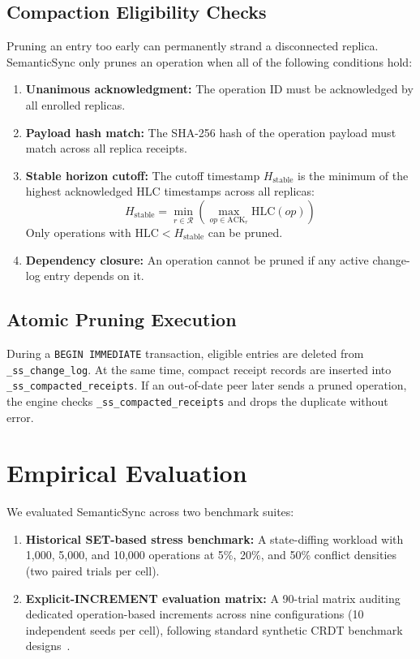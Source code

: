\documentclass[conference]{IEEEtran}
\begin{document}
\subsection{Compaction Eligibility Checks}
Pruning an entry too early can permanently strand a disconnected replica. SemanticSync only prunes an operation when all of the following conditions hold:
\begin{enumerate}
    \item \textbf{Unanimous acknowledgment:} The operation ID must be acknowledged by all enrolled replicas.
    \item \textbf{Payload hash match:} The SHA-256 hash of the operation payload must match across all replica receipts.
    \item \textbf{Stable horizon cutoff:} The cutoff timestamp $H_{\text{stable}}$ is the minimum of the highest acknowledged HLC timestamps across all replicas:
    \begin{equation}
    H_{\text{stable}} = \min_{r \in \mathcal{R}} \left( \max_{op \in \text{ACK}_r} \text{HLC}(op) \right)
    \end{equation}
    Only operations with $\text{HLC} < H_{\text{stable}}$ can be pruned.
    \item \textbf{Dependency closure:} An operation cannot be pruned if any active change-log entry depends on it.
\end{enumerate}

\subsection{Atomic Pruning Execution}
During a \texttt{BEGIN IMMEDIATE} transaction, eligible entries are deleted from \texttt{\_ss\_change\_log}. At the same time, compact receipt records are inserted into \texttt{\_ss\_compacted\_receipts}. If an out-of-date peer later sends a pruned operation, the engine checks \texttt{\_ss\_compacted\_receipts} and drops the duplicate without error.

\section{Empirical Evaluation}

We evaluated SemanticSync across two benchmark suites:
\begin{enumerate}
    \item \textbf{Historical SET-based stress benchmark:} A state-diffing workload with 1,000, 5,000, and 10,000 operations at 5\%, 20\%, and 50\% conflict densities (two paired trials per cell).
    \item \textbf{Explicit-INCREMENT evaluation matrix:} A 90-trial matrix auditing dedicated operation-based increments across nine configurations (10 independent seeds per cell), following standard synthetic CRDT benchmark designs~\cite{crust2025}.
\end{enumerate}
\end{document}
